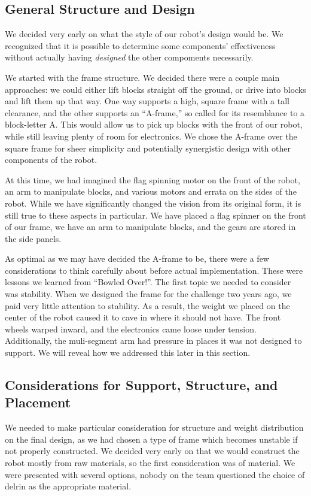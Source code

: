 \newpage \subsection{General Structure and Design}
We decided very early on what the style of our robot's design would be. We recognized that it is possible to determine some components' effectiveness without actually having \textit{designed} the other compoments necessarily. 

We started with the frame structure. We decided there were a couple main approaches: we could either lift blocks straight off the ground, or drive into blocks and lift them up that way. One way supports a high, square frame with a tall clearance, and the other supports an ``A-frame,'' so called for its resemblance to a block-letter A. This would allow us to pick up blocks with the front of our robot, while still leaving plenty of room for electronics. We chose the A-frame over the square frame for sheer simplicity and potentially synergistic design with other components of the robot. 

At this time, we had imagined the flag spinning motor on the front of the robot, an arm to manipulate blocks, and various motors and errata on the sides of the robot. While we have significantly changed the vision from its original form, it is still true to these aspects in particular. We have placed a flag spinner on the front of our frame, we have an arm to manipulate blocks, and the gears are stored in the side panels. 

As optimal as we may have decided the A-frame to be, there were a few considerations to think carefully about before actual implementation. These were lessons we learned from ``Bowled Over!''. The first topic we needed to consider was stability. When we designed the frame for the challenge two years ago, we paid very little attention to stability. As a result, the weight we placed on the center of the robot caused it to cave in where it should not have. The front wheels warped inward, and the electronics came loose under tension. Additionally, the muli-segment arm had pressure in places it was not designed to support. We will reveal how we addressed this later in this section.

\newpage \subsection{Considerations for Support, Structure, and Placement}
We needed to make particular consideration for structure and weight distribution on the final design, as we had chosen a type of frame which becomes unstable if not properly constructed. We decided very early on that we would construct the robot mostly from raw materials, so the first consideration was of material. We were presented with several options, nobody on the team questioned the choice of delrin as the appropriate material.


